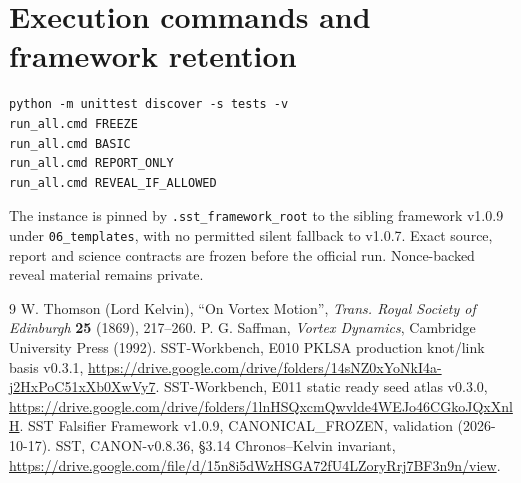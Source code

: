 \documentclass[10pt,a4paper]{article}
\begin{document}
\section{Execution commands and framework retention}
\begin{verbatim}
python -m unittest discover -s tests -v
run_all.cmd FREEZE
run_all.cmd BASIC
run_all.cmd REPORT_ONLY
run_all.cmd REVEAL_IF_ALLOWED
\end{verbatim}
The instance is pinned by \texttt{.sst\_framework\_root} to the sibling
framework v1.0.9 under \texttt{06\_templates}, with no permitted silent
fallback to v1.0.7. Exact source, report and science contracts are frozen
before the official run. Nonce-backed reveal material remains private.
\begin{thebibliography}{9}\small
{} W. Thomson (Lord Kelvin), ``On Vortex Motion'', \emph{Trans. Royal Society of Edinburgh} \textbf{25} (1869), 217--260.
 P. G. Saffman, \emph{Vortex Dynamics}, Cambridge University Press (1992).
 SST-Workbench, E010 PKLSA production knot/link basis v0.3.1, \url{https://drive.google.com/drive/folders/14sNZ0xYoNkI4a-j2HxPoC51xXb0XwVy7}.
 SST-Workbench, E011 static ready seed atlas v0.3.0, \url{https://drive.google.com/drive/folders/1lnHSQxcmQwvlde4WEJo46CGkoJQxXnlH}.
 SST Falsifier Framework v1.0.9, CANONICAL\_FROZEN, validation (2026-10-17).
 SST, CANON-v0.8.36, \S3.14 Chronos--Kelvin invariant, \url{https://drive.google.com/file/d/15n8i5dWzHSGA72fU4LZoryRrj7BF3n9n/view}.
\end{thebibliography}
\end{document}

